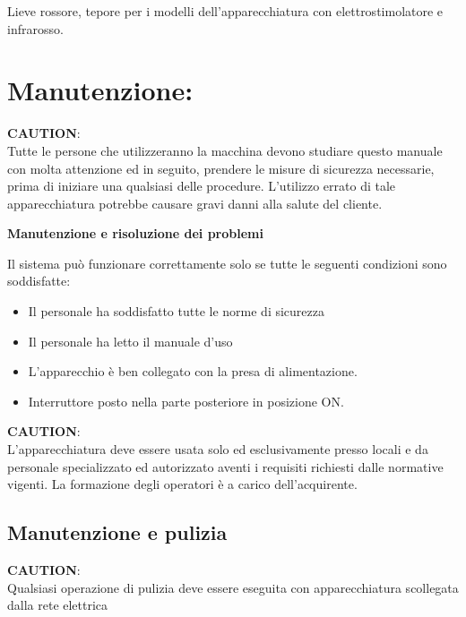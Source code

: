 \documentclass[a4paper]{article}
\begin{document}
Lieve rossore, tepore per i modelli dell'apparecchiatura con elettrostimolatore e infrarosso.

\section{Manutenzione:}
\noindent \faExclamationTriangle \textbf{CAUTION}:
\\
Tutte le persone che utilizzeranno la macchina devono studiare questo manuale con molta attenzione ed in seguito, prendere le misure di sicurezza necessarie, prima di iniziare una qualsiasi delle procedure. L'utilizzo errato di tale apparecchiatura potrebbe causare gravi danni alla salute del cliente.

\vspace{5pt}
\noindent \textbf{Manutenzione e risoluzione dei problemi}

\vspace{5pt}
Il sistema può funzionare correttamente solo se tutte le seguenti condizioni sono soddisfatte:

\begin{itemize}
  \item Il personale ha soddisfatto tutte le norme di sicurezza
  \item Il personale ha letto il manuale d'uso
  \item L'apparecchio è ben collegato con la presa di alimentazione.
  \item Interruttore posto nella parte posteriore in posizione ON.
\end{itemize}

\noindent \faExclamationTriangle \textbf{CAUTION}:
\\
L'apparecchiatura deve essere usata solo ed esclusivamente presso locali e da personale specializzato ed autorizzato aventi i requisiti richiesti dalle normative vigenti. La formazione degli operatori è a carico dell'acquirente.

\subsection{Manutenzione e pulizia}
\noindent \faExclamationTriangle \textbf{CAUTION}:
\\
Qualsiasi operazione di pulizia deve essere eseguita con apparecchiatura scollegata dalla rete elettrica
\end{document}
